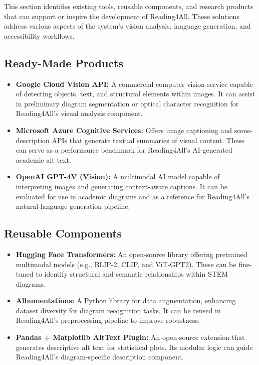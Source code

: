 \documentclass[12pt]{article}
\begin{document}
This section identifies existing tools, reusable components, and
research products that can support or inspire the development of
Reading4All. These solutions address various aspects of the system’s
vision analysis, language generation, and accessibility workflows.

\subsection{Ready-Made Products}

\begin{itemize}
  \item \textbf{Google Cloud Vision API:} A commercial computer
    vision service capable of detecting objects, text, and structural
    elements within images. It can assist in preliminary diagram
    segmentation or optical character recognition for Reading4All’s
    visual analysis component.

  \item \textbf{Microsoft Azure Cognitive Services:} Offers image
    captioning and scene-description APIs that generate textual
    summaries of visual content. These can serve as a performance
    benchmark for Reading4All’s AI-generated academic alt text.

  \item \textbf{OpenAI GPT-4V (Vision):} A multimodal AI model
    capable of interpreting images and generating context-aware
    captions. It can be evaluated for use in academic diagrams and as
    a reference for Reading4All’s natural-language generation pipeline.
\end{itemize}

\subsection{Reusable Components}

\begin{itemize}
  \item \textbf{Hugging Face Transformers:} An open-source library
    offering pretrained multimodal models (e.g., BLIP-2, CLIP, and
    ViT-GPT2). These can be fine-tuned to identify structural and
    semantic relationships within STEM diagrams.

  \item \textbf{Albumentations:} A Python library for data
    augmentation, enhancing dataset diversity for diagram recognition
    tasks. It can be reused in Reading4All’s preprocessing pipeline
    to improve robustness.

  \item \textbf{Pandas + Matplotlib AltText Plugin:} An open-source
    extension that generates descriptive alt text for statistical
    plots. Its modular logic can guide Reading4All’s diagram-specific
    description component.
\end{itemize}
\end{document}
